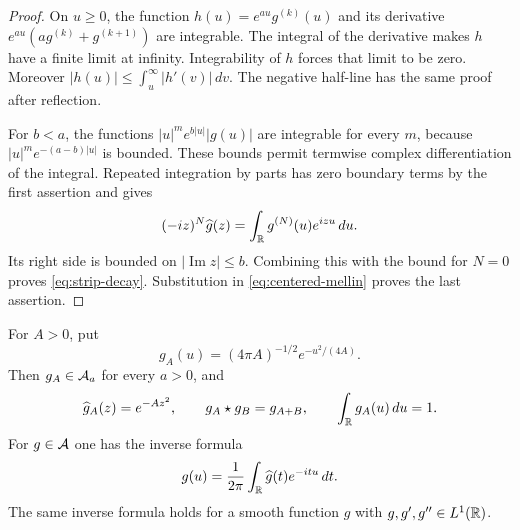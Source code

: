 \begin{proof}
On $u\geq0$, the function $h(u)=e^{au}g^{(k)}(u)$ and its derivative
$e^{au}(ag^{(k)}+g^{(k+1)})$ are integrable.
The integral of the derivative makes $h$ have a finite limit at infinity.
Integrability of $h$ forces that limit to be zero.
Moreover $|h(u)|\leq\int_u^\infty|h'(v)|\,dv$.
The negative half-line has the same proof after reflection.

For $b<a$, the functions $|u|^m e^{b|u|}|g(u)|$ are integrable for every
$m$, because $|u|^m e^{-(a-b)|u|}$ is bounded.
These bounds permit termwise complex differentiation of the integral.
Repeated integration by parts has zero boundary terms by the first assertion
and gives
\[
 (-iz)^N\widehat g(z)=\int_{\mathbb R}g^{(N)}(u)e^{izu}\,du.
\]
Its right side is bounded on $|\operatorname{Im}z|\leq b$.
Combining this with the bound for $N=0$ proves \eqref{eq:strip-decay}.
Substitution in \eqref{eq:centered-mellin} proves the last assertion.
\end{proof}

\begin{lemma}
\label{lem:gaussian}
For $A>0$, put
\[
 g_A(u)=(4\pi A)^{-1/2}e^{-u^2/(4A)}.
\]
Then $g_A\in\mathcal A_a$ for every $a>0$, and
\begin{equation}
 \widehat g_A(z)=e^{-Az^2},\qquad
 g_A\star g_B=g_{A+B},\qquad \int_{\mathbb R}g_A(u)\,du=1.
 \label{eq:gaussian}
\end{equation}
For $g\in\mathcal A$ one has the inverse formula
\begin{equation}
 g(u)=\frac1{2\pi}\int_{\mathbb R}\widehat g(t)e^{-itu}\,dt.
 \label{eq:inverse}
\end{equation}
The same inverse formula holds for a smooth function $g$ with
$g,g',g''\in L^1(\mathbb R)$.
\end{lemma}

